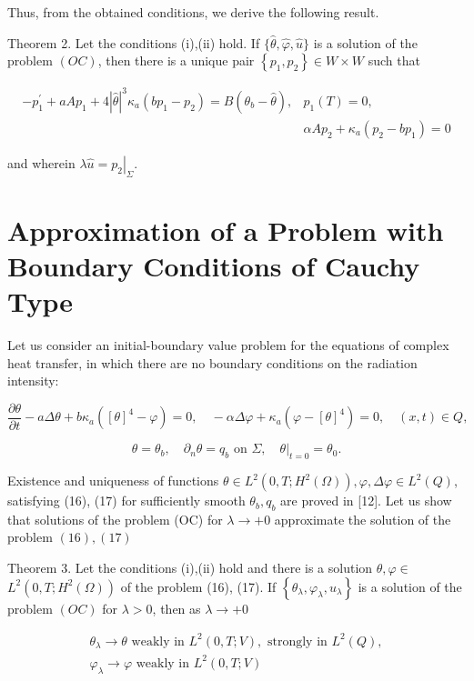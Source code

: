 \documentclass[10pt]{article}
\begin{document}
Thus, from the obtained conditions, we derive the following result.

Theorem 2. Let the conditions (i),(ii) hold. If $\{\widehat{\theta}, \widehat{\varphi}, \widehat{u}\}$ is a solution of the problem $(O C)$, then there is a unique pair $\left\{p_{1}, p_{2}\right\} \in W \times W$ such that

$$
\begin{aligned}
-p_{1}^{\prime}+a A p_{1}+4|\widehat{\theta}|^{3} \kappa_{a}\left(b p_{1}-p_{2}\right)=B\left(\theta_{b}-\widehat{\theta}\right), & p_{1}(T)=0, \\
& \alpha A p_{2}+\kappa_{a}\left(p_{2}-b p_{1}\right)=0
\end{aligned}
$$

and wherein $\lambda \widehat{u}=\left.p_{2}\right|_{\Sigma}$.

\section{Approximation of a Problem with Boundary Conditions of Cauchy Type}
Let us consider an initial-boundary value problem for the equations of complex heat transfer, in which there are no boundary conditions on the radiation intensity:

$$
\frac{\partial \theta}{\partial t}-a \Delta \theta+b \kappa_{a}\left([\theta]^{4}-\varphi\right)=0, \quad-\alpha \Delta \varphi+\kappa_{a}\left(\varphi-[\theta]^{4}\right)=0, \quad(x, t) \in Q,
$$

$$
\theta=\theta_{b}, \quad \partial_{n} \theta=q_{b} \text { on } \Sigma,\left.\quad \theta\right|_{t=0}=\theta_{0} .
$$

Existence and uniqueness of functions $\theta \in L^{2}\left(0, T ; H^{2}(\Omega)\right), \varphi, \Delta \varphi \in L^{2}(Q)$, satisfying (16), (17) for sufficiently smooth $\theta_{b}, q_{b}$ are proved in [12]. Let us show that solutions of the problem (OC) for $\lambda \rightarrow+0$ approximate the solution of the problem $(16),(17)$

Theorem 3. Let the conditions (i),(ii) hold and there is a solution $\theta, \varphi \in$ $L^{2}\left(0, T ; H^{2}(\Omega)\right)$ of the problem (16), (17). If $\left\{\theta_{\lambda}, \varphi_{\lambda}, u_{\lambda}\right\}$ is a solution of the problem $(O C)$ for $\lambda>0$, then as $\lambda \rightarrow+0$

$$
\begin{gathered}
\theta_{\lambda} \rightarrow \theta \text { weakly in } L^{2}(0, T ; V), \text { strongly in } L^{2}(Q), \\
\varphi_{\lambda} \rightarrow \varphi \text { weakly in } L^{2}(0, T ; V)
\end{gathered}
$$
\end{document}
